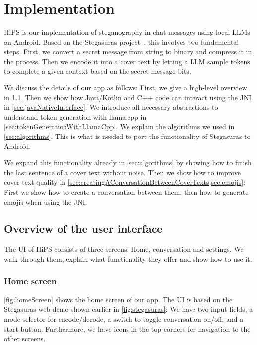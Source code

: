 
\chapter{Implementation}\label{ch:implementation}
\glsresetall %

\gls{HiPS} is our implementation of steganography in chat messages using local \glspl{LLM} on Android. Based on the Stegasuras project~\cite{zieglerNeuralLinguisticSteganography2019}, this involves two fundamental steps. First, we convert a secret message from string to binary and compress it in the process. Then we encode it into a cover text by letting a \gls{LLM} sample tokens to complete a given context based on the secret message bits.

We discuss the details of our app as follows: First, we give a high-level overview in \cref{sec:overviewOfTheUserInterface}. Then we show how Java/Kotlin and C++ code can interact using the \gls{JNI} in \cref{sec:javaNativeInterface}. We introduce all necessary abstractions to understand token generation with llama.cpp in \cref{sec:tokenGenerationWithLlamaCpp}. We explain the algorithms we used in \cref{sec:algorithms}. This is what is needed to port the functionality of Stegasuras to Android.

We expand this functionality already in \cref{sec:algorithms} by showing how to finish the last sentence of a cover text without noise. Then we show how to improve cover text quality in \cref{sec:creatingAConversationBetweenCoverTexts,sec:emojis}: First we show how to create a conversation between them, then how to generate emojis when using the \gls{JNI}.

\section{Overview of the user interface}
\label{sec:overviewOfTheUserInterface}
The \gls{UI} of \gls{HiPS} consists of three screens: Home, conversation and settings. We walk through them, explain what functionality they offer and show how to use it.

\subsection{Home screen}
\label{sec:homeScreen}
\cref{fig:homeScreen} shows the home screen of our app. The \gls{UI} is based on the Stegasuras web demo shown earlier in \cref{fig:stegasuras}: We have two input fields, a mode selector for encode/decode, a switch to toggle conversation on/off, and a start button. Furthermore, we have icons in the top corners for navigation to the other screens.

